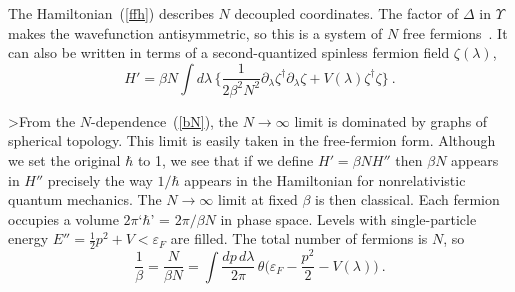 The Hamiltonian~(\ref{ffh}) describes $N$ decoupled
coordinates.  The factor of $\Delta$ in $\Upsilon$ makes the
wavefunction antisymmetric, so this is a system of $N$ free
fermions~\cite{BIPZ}.  It can also be written in terms of a
second-quantized spinless fermion field $\zeta(\lambda)$,
\begin{equation}
H' =  \beta N \int d\lambda\, \biggl\{ \frac{1}{2\beta^2 N^2}
\partial_\lambda
\zeta^\dagger \partial_\lambda \zeta 
+ V(\lambda) \zeta^\dagger \zeta \biggr\}\ .
\label{2q}
\end{equation}

>From the $N$-dependence~(\ref{bN}), the $N \to \infty$ limit is
dominated by graphs of spherical topology.  This limit is easily
taken in the free-fermion form.  Although we set the original
$\hbar$ to 1, we see that if we define $H' = \beta N H''$ then
$\beta N$ appears in $H''$ precisely the way $1/\hbar$ appears
in the Hamiltonian for nonrelativistic quantum mechanics.
The $N \to \infty$
limit at fixed $\beta$ is then
classical.  Each fermion occupies a volume $2\pi$`$\hbar$' =
$2\pi/\beta N$ in phase space.  Levels with single-particle energy
$E'' = \frac{1}{2} p^2 + V < \varepsilon_F$ are
filled.  The total number of fermions is $N$, so
\begin{equation}
\frac{1}{\beta} =
\frac{N}{\beta N} = \int \frac{dp\,d\lambda}{2\pi}\,
\theta\biggl( \varepsilon_F -
\frac{p^2 }{2} - V(\lambda) \biggr)\ . \label{nfcon}
\end{equation}

